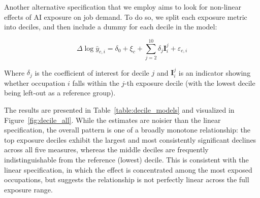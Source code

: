 \documentclass[11pt]{article}
\begin{document}
Another alternative specification that we employ aims to look for non-linear effects of AI exposure on job demand. To do so, we split each exposure metric into deciles, and then include a dummy for each decile in the model:

\begin{equation}
\Delta\log{\bar{y}}_{c,i} = \delta_0 + \xi_c + \sum_{j=2}^{10}\delta_j\mathbf{I}^j_i  + \varepsilon_{c,i}
\label{eq:deciles}
\end{equation}

Where $\delta_j$ is the coefficient of interest for decile $j$ and $\mathbf{I}^j_i$ is an indicator showing whether occupation $i$ falls within the $j$-th exposure decile (with the lowest decile being left-out as a reference group).

The results are presented in Table~\ref{table:decile_models} and visualized in Figure~\ref{fig:decile_all}. While the estimates are noisier than the linear specification, the overall pattern is one of a broadly monotone relationship: the top exposure deciles exhibit the largest and most consistently significant declines across all five measures, whereas the middle deciles are frequently indistinguishable from the reference (lowest) decile. This is consistent with the linear specification, in which the effect is concentrated among the most exposed occupations, but suggests the relationship is not perfectly linear across the full exposure range.
\end{document}
